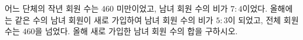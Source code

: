 어느 단체의 작년 회원 수는 $460$ 미만이었고, 남녀 회원 수의 비가 $7:4$이었다. 올해에는 같은 수의 남녀 회원이 새로 가입하여 남녀 회원 수의 비가 $5:3$이 되었고, 전체 회원 수는 $460$을 넘었다. 올해 새로 가입한 남녀 회원 수의 합을 구하시오. 
